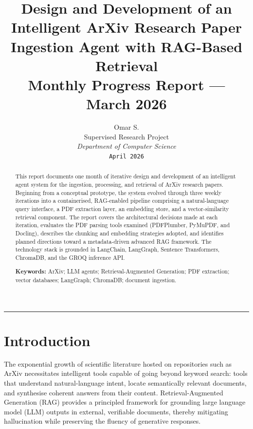 \documentclass[12pt, a4paper]{article}
\title{%
    \textbf{Design and Development of an Intelligent ArXiv Research Paper
    Ingestion Agent with RAG-Based Retrieval} \\[0.4em]
    \large Monthly Progress Report --- March 2026
}
\author{
    Omar S.\\[0.2em]
    \small Supervised Research Project \\
    \small \textit{Department of Computer Science} \\[0.4em]
    \small \texttt{April 2026}
}
\date{}
\begin{document}
\maketitle
\thispagestyle{empty}

\begin{abstract}
This report documents one month of iterative design and development of an
intelligent agent system for the ingestion, processing, and retrieval of
ArXiv research papers. Beginning from a conceptual prototype, the system
evolved through three weekly iterations into a containerised, RAG-enabled
pipeline comprising a natural-language query interface, a PDF extraction
layer, an embedding store, and a vector-similarity retrieval component.
The report covers the architectural decisions made at each iteration,
evaluates the PDF parsing tools examined (PDFPlumber, PyMuPDF, and
Docling), describes the chunking and embedding strategies adopted, and
identifies planned directions toward a metadata-driven advanced RAG
framework. The technology stack is grounded in LangChain, LangGraph,
Sentence Transformers, ChromaDB, and the GROQ inference API.

\noindent\textbf{Keywords:} ArXiv; LLM agents; Retrieval-Augmented Generation;
PDF extraction; vector databases; LangGraph; ChromaDB; document ingestion.
\end{abstract}

\vspace{1em}
\hrule
\vspace{1.5em}

\tableofcontents
\newpage

\section{Introduction}
\label{sec:intro}

The exponential growth of scientific literature hosted on repositories such
as ArXiv necessitates intelligent tools capable of going beyond keyword
search: tools that understand natural-language intent, locate semantically
relevant documents, and synthesise coherent answers from their content.
Retrieval-Augmented Generation (RAG) \cite{lewis2020rag} provides a
principled framework for grounding large language model (LLM) outputs in
external, verifiable documents, thereby mitigating hallucination while
preserving the fluency of generative responses.
\end{document}
